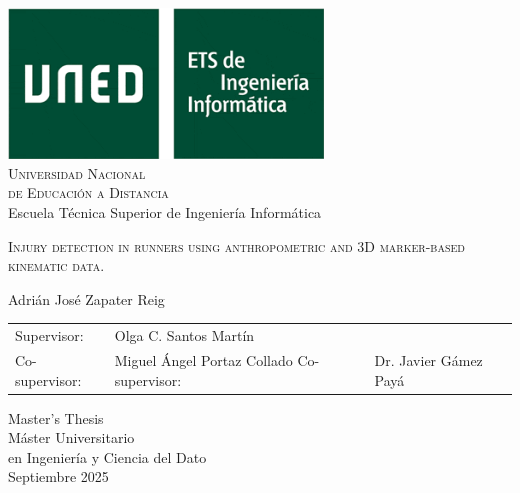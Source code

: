 \begin{titlepage}
\centering
	\includegraphics[height=4cm]{ images/logo_informatica_s.png}\\
	\vspace{0.25cm}
 	{\Large \textsc{{Universidad Nacional\\ de Educación a Distancia}}}\\
 	\vspace{0.8cm}
	{\Large Escuela Técnica Superior de Ingeniería Informática}\\
	\vspace{0.25cm}
	\vspace{1.5cm}
    \begin{spacing}{2}
  	{\textsc{\Huge Injury detection in runners using anthropometric and 3D marker-based kinematic data.}}
    \end{spacing}
	\vfill
	{\Large Adrián José Zapater Reig}\\
	\vspace{0.3cm}
	\begin{tabular}{ll}

	\large Supervisor: & \large Olga C. Santos Martín\\
	\vspace{0.3cm}
	\large Co-supervisor: & \large Miguel Ángel Portaz Collado
	\large Co-supervisor: & \large Dr. Javier Gámez Payá 
	\end{tabular}
	
	\vfill
	{\Large Master's Thesis}\\
	\vspace{0.3cm}
	{\large Máster Universitario\\ en Ingeniería y Ciencia del Dato}\\
	\vspace{0.25cm}
	Septiembre 2025
\end{titlepage}
